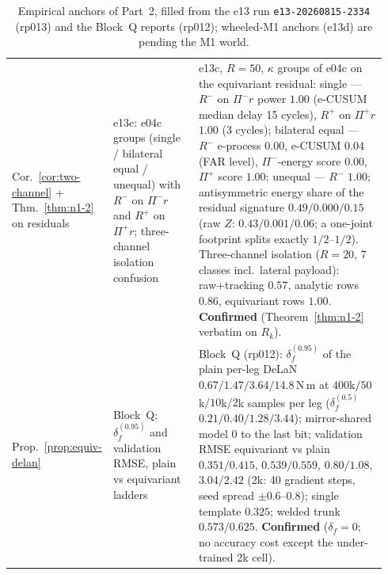 \begin{table}[p]
\begin{tabular}{@{}>{\raggedright\arraybackslash}p{0.15\linewidth}>{\raggedright\arraybackslash}p{0.24\linewidth}p{0.55\linewidth}@{}}
Cor.~\ref{cor:two-channel} + Thm.~\ref{thm:n1-2} on residuals &
e13c: e04c groups (single / bilateral equal / unequal) with $R^{-}$ on
$\Pi^{-}r$ and $R^{+}$ on $\Pi^{+}r$; three-channel isolation confusion &
e13c, $R=50$, $\kappa$ groups of e04c on the equivariant residual: single --- $R^-$ on $\Pi^-r$ power $1.00$ (e-CUSUM median delay 15 cycles), $R^+$ on $\Pi^+r$ $1.00$ (3 cycles); bilateral equal --- $R^-$ e-process $0.00$, e-CUSUM $0.04$ (FAR level), $\Pi^-$-energy score $0.00$, $\Pi^+$ score $1.00$; unequal --- $R^-$ $1.00$; antisymmetric energy share of the residual signature $0.49 / 0.000 / 0.15$ (raw $Z$: $0.43/0.001/0.06$; a one-joint footprint splits exactly $1/2$--$1/2$). Three-channel isolation ($R=20$, 7 classes incl.\ lateral payload): raw+tracking $0.57$, analytic rows $0.86$, equivariant rows $1.00$. \textbf{Confirmed} (Theorem~\ref{thm:n1-2} verbatim on $R_k$). \\
Prop.~\ref{prop:equiv-delan} &
Block~Q: $\delta_f^{(0.95)}$ and validation RMSE, plain vs equivariant
ladders &
Block~Q (rp012): $\delta_f^{(0.95)}$ of the plain per-leg DeLaN $0.67 / 1.47 / 3.64 / 14.8$\,N\,m at $400$k$/50$k$/10$k$/2$k samples per leg ($\delta_f^{(0.5)}$ $0.21/0.40/1.28/3.44$); mirror-shared model $0$ to the last bit; validation RMSE equivariant vs plain $0.351/0.415$, $0.539/0.559$, $0.80/1.08$, $3.04/2.42$ (2k: 40 gradient steps, seed spread $\pm 0.6$--$0.8$); single template $0.325$; welded trunk $0.573/0.625$. \textbf{Confirmed} ($\delta_f=0$; no accuracy cost except the under-trained 2k cell). \\
\bottomrule
\end{tabular}
\caption{Empirical anchors of Part~2, filled from the e13 run
\texttt{e13-20260815-2334} (rp013) and the Block~Q reports (rp012);
wheeled-M1 anchors (e13d) are pending the M1 world.}
\label{tab:anchors}
\end{table}

